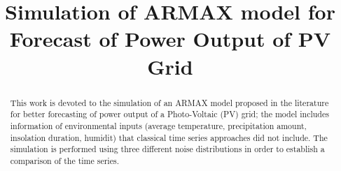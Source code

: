 \documentclass[conference]{IEEEtran}
\begin{document}
\title{Simulation of ARMAX model for Forecast of Power Output of PV Grid\\}

\author{
\and
{}
}

\maketitle

\begin{abstract}
This work is devoted to the simulation of an ARMAX model proposed in the literature for better forecasting of power output of a Photo-Voltaic (PV) grid; the model includes information of environmental inputs (average temperature, precipitation amount, insolation duration, humidit) that classical time series approaches did not include. The simulation is performed using three different noise distributions in order to establish a comparison of the time series.
\end{abstract}

\begin{IEEEkeywords}

\end{IEEEkeywords}







\nocite{*}


\end{document}
